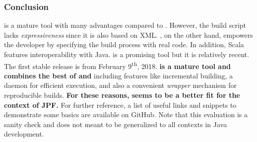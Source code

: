 \documentclass{article}
\begin{document}
\subsubsection*{Conclusion}
\maven{} is a mature tool with many advantages compared to \ant{}.
However, the build script lacks \emph{expressiveness} since it is also based on
XML.
\sbt{}, on the other hand, empowers the developer by specifying the build
process with real code.
In addition, Scala features interoperability with Java.
\sbt{} is a promising tool but it is relatively recent.
The first stable release is from February 9\textsuperscript{th},
2018\cite{page:sbt-release}.
\textbf{\gradle{} is a mature tool and combines the best of \maven{} and \sbt{}}
including features like incremental building, a daemon for efficient
execution\cite{page:gradle-daemon}, and also a convenient \emph{wrapper}
mechanism\cite{page:gradle-wrapper} for reproducible builds.
\textbf{For these reasons, \gradle{} seems to be a better fit for the context
of JPF.}
For further reference, a list of useful links and snippets to demonstrate some
\gradle{} basics are available on GitHub\cite{page:gradle-labs}.
Note that this evaluation is a sanity check and does not meant to be
generalized to all contexts in Java development.

\clearpage


\end{document}
